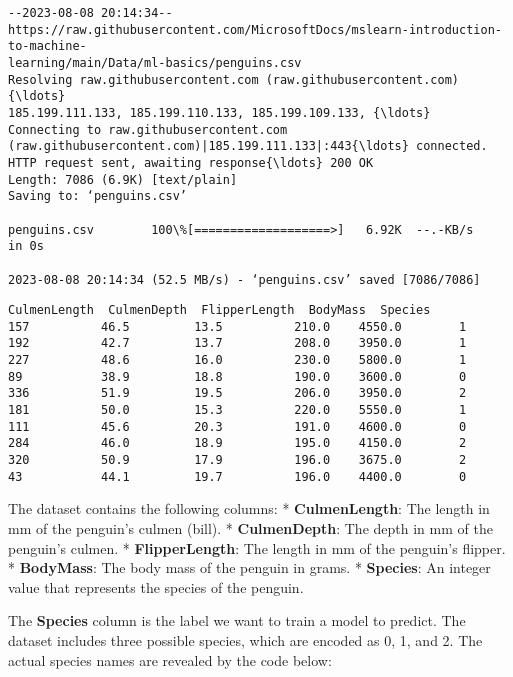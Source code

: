 \documentclass[11pt]{article}
\makeatletter
\newcommand{\boxspacing}{\kern\kvtcb@left@rule\kern\kvtcb@boxsep}
\newcommand{\prompt}[4]{
        {\ttfamily\llap{{\color{#2}[#3]:\hspace{3pt}#4}}\vspace{-\baselineskip}}
    }
\makeatother
\begin{document}
    \begin{Verbatim}[commandchars=\\\{\}]
--2023-08-08 20:14:34--
https://raw.githubusercontent.com/MicrosoftDocs/mslearn-introduction-to-machine-
learning/main/Data/ml-basics/penguins.csv
Resolving raw.githubusercontent.com (raw.githubusercontent.com){\ldots}
185.199.111.133, 185.199.110.133, 185.199.109.133, {\ldots}
Connecting to raw.githubusercontent.com
(raw.githubusercontent.com)|185.199.111.133|:443{\ldots} connected.
HTTP request sent, awaiting response{\ldots} 200 OK
Length: 7086 (6.9K) [text/plain]
Saving to: ‘penguins.csv’

penguins.csv        100\%[===================>]   6.92K  --.-KB/s    in 0s

2023-08-08 20:14:34 (52.5 MB/s) - ‘penguins.csv’ saved [7086/7086]

    \end{Verbatim}

            \begin{tcolorbox}[breakable, size=fbox, boxrule=.5pt, pad at break*=1mm, opacityfill=0]
\prompt{Out}{outcolor}{1}{\boxspacing}
\begin{Verbatim}[commandchars=\\\{\}]
     CulmenLength  CulmenDepth  FlipperLength  BodyMass  Species
157          46.5         13.5          210.0    4550.0        1
192          42.7         13.7          208.0    3950.0        1
227          48.6         16.0          230.0    5800.0        1
89           38.9         18.8          190.0    3600.0        0
336          51.9         19.5          206.0    3950.0        2
181          50.0         15.3          220.0    5550.0        1
111          45.6         20.3          191.0    4600.0        0
284          46.0         18.9          195.0    4150.0        2
320          50.9         17.9          196.0    3675.0        2
43           44.1         19.7          196.0    4400.0        0
\end{Verbatim}
\end{tcolorbox}
        
    The dataset contains the following columns: * \textbf{CulmenLength}: The
length in mm of the penguin's culmen (bill). * \textbf{CulmenDepth}: The
depth in mm of the penguin's culmen. * \textbf{FlipperLength}: The
length in mm of the penguin's flipper. * \textbf{BodyMass}: The body
mass of the penguin in grams. * \textbf{Species}: An integer value that
represents the species of the penguin.

The \textbf{Species} column is the label we want to train a model to
predict. The dataset includes three possible species, which are encoded
as 0, 1, and 2. The actual species names are revealed by the code below:
\end{document}
